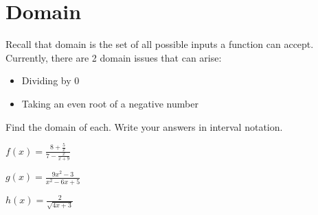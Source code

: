 \section*{Domain}

Recall that domain is the set of all possible inputs a function can accept. Currently, there are 2 domain issues that can arise:

\begin{itemize}
\item Dividing by 0
\item Taking an even root of a negative number
\end{itemize}

\begin{example}
Find the domain of each. Write your answers in interval notation.
\begin{enumerate}[(a)]
\begin{multicols}{3}
	\item $f(x) = \frac{8 + \frac{5}{x}}{7-\frac{x}{x+9}}$
	\item $g(x) = \frac{9x^2-3}{x^2 - 6x + 5}$
	\item $h(x) = \frac{2}{\sqrt{4x+3}}$
\end{multicols}
\end{enumerate}
\end{example}

